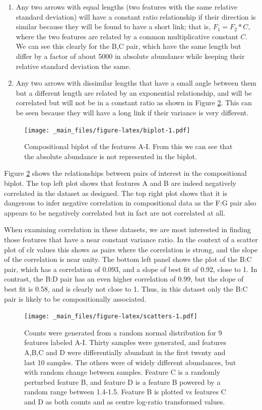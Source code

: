 \documentclass[onecolumn]{article}
\begin{document}
\begin{enumerate}
\item
  Any two arrows with equal lengths (two features with the same relative standard deviation) will have a constant ratio relationship if their direction is similar because they will be found to have a short link; that is, \(F_1 = F_2 * C\), where the two features are related by a common multiplicative constant \(C\). We can see this clearly for the B,C pair, which have the same length but differ by a factor of about 5000 in absolute abundance while keeping their relative standard deviation the same.
\item
  Any two arrows with dissimilar lengths that have a small angle between them but a different length are related by an exponential relationship, and will be correlated but will not be in a constant ratio as shown in Figure \ref{fig:scatters}. This can be seen because they will have a long link if their variance is very different.
\end{enumerate}

\begin{figure}
\centering
\texttt{[image: \_main\_files/figure-latex/biplot-1.pdf]}
\caption{\label{fig:biplot}Compositional biplot of the features A-I. From this we can see that the absolute abundance is not represented in the biplot.}
\end{figure}

Figure \ref{fig:scatters} shows the relationships between pairs of interest in the compositional biplot. The top left plot shows that features A and B are indeed negatively correlated in the dataset as designed. The top right plot shows that it is dangerous to infer negative correlation in compositional data as the F:G pair also appears to be negatively correlated but in fact are not correlated at all.

When examining correlation in these datasets, we are most interested in finding those features that have a near constant variance ratio. In the context of a scatter plot of clr values this shows as pairs where the correlation is strong, and the slope of the correlation is near unity. The bottom left panel shows the plot of the B:C pair, which has a correlation of 0.093, and a slope of best fit of 0.92, close to 1. In contrast, the B:D pair has an even higher correlation of 0.99, but the slope of best fit is 0.58, and is clearly not close to 1. Thus, in this dataset only the B:C pair is likely to be compositionally associated.

\begin{figure}
\centering
\texttt{[image: \_main\_files/figure-latex/scatters-1.pdf]}
\caption{\label{fig:scatters}Counts were generated from a random normal distribution for 9 features labeled A-I. Thirty samples were generated, and features A,B,C and D were differentially abundant in the first twenty and last 10 samples. The others were of widely different abundances, but with random change between samples. Feature C is a randomly perturbed feature B, and feature D is a feature B powered by a random range between 1.4-1.5. Feature B is plotted vs features C and D as both counts and as centre log-ratio transformed values.}
\end{figure}
\end{document}
